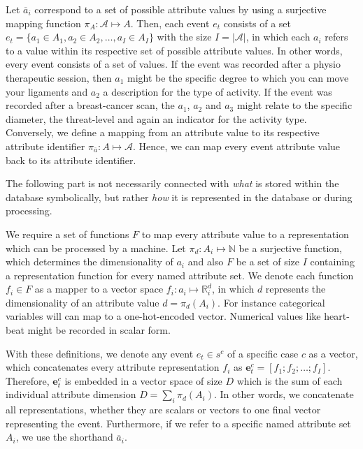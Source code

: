 \documentclass[./../../paper.tex]{subfiles}
\begin{document}
Let $\overline{a}_i$ correspond to a set of possible attribute values by using a surjective mapping function $\pi_A : \mathcal{A} \mapsto A$. Then, each event $e_t$ consists of a set $e_t = \{ a_1 \in A_1, a_2 \in A_2, \ldots, a_I \in A_I\}$ with the size $I = |\mathcal{A}|$, in which each $a_i$ refers to a value within its respective set of possible attribute values. In other words, every event consists of a set of values. If the event was recorded after a physio therapeutic session, then $a_1$ might be the specific degree to which you can move your ligaments and $a_2$ a description for the type of activity. If the event was recorded after a breast-cancer scan, the $a_1$, $a_2$ and $a_3$ might relate to the specific diameter, the threat-level and again an indicator for the activity type. 
Conversely, we define a mapping from an attribute value to its respective attribute identifier $\pi_{\overline{a}} : A \mapsto \mathcal{A}$. Hence, we can map every event attribute value back to its attribute identifier. 

The following part is not necessarily connected with \emph{what} is stored within the database symbolically, but rather \emph{how} it is represented in the database or during processing. 

We require a set of functions $F$ to map every attribute value to a representation which can be processed by a machine.
Let $\pi_d : A_i \mapsto \mathbb{N}$ be a surjective function, which determines the dimensionality of $a_i$ and also $F$ be a set of size $I$ containing a representation function for every named attribute set. We denote each function $f_i \in F$ as a mapper to a vector space $f_i : a_i \mapsto \mathbb{R}^d_i$, in which $d$ represents the dimensionality of an attribute value $d = \pi_d(A_i)$. For instance categorical variables will can map to a one-hot-encoded vector. Numerical values like heart-beat might be recorded in scalar form.

With these definitions, we denote any event $e_t \in s^c$ of a specific case $c$ as a vector, which concatenates every attribute representation $f_i$ as $\mathbf{e}_t^{c} = [f_1; f_2; \ldots; f_I]$. Therefore, $\mathbf{e}_t^{c}$ is embedded in a vector space of size $D$ which is the sum of each individual attribute dimension $D = \sum_i \pi_d(A_i)$. In other words, we concatenate all representations, whether they are scalars or vectors to one final vector representing the event. Furthermore, if we refer to a specific named attribute set $A_i$, we use the shorthand $\overline{a}_i$. 
\end{document}

